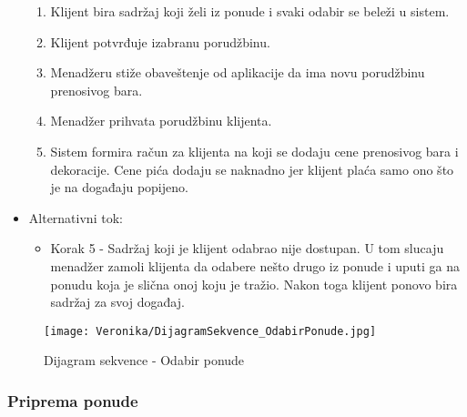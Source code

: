 \documentclass[a4paper]{article}
\begin{document}
\begin{itemize}
\begin{enumerate}
        \item Klijent bira sadržaj koji želi iz ponude i svaki odabir se beleži u sistem.
        \item Klijent potvrđuje izabranu porudžbinu.
        \item Menadžeru stiže obaveštenje od aplikacije da ima novu porudžbinu prenosivog bara.
        \item Menadžer prihvata porudžbinu klijenta.
        \item Sistem formira račun za klijenta na koji se dodaju cene prenosivog bara i dekoracije. Cene pića dodaju se naknadno jer klijent plaća samo ono što je na događaju popijeno.
        \end{enumerate}
        \item Alternativni tok:
        \begin{itemize}
            \item Korak 5 - Sadržaj koji je klijent odabrao nije dostupan. U tom slucaju menadžer zamoli klijenta da odabere nešto drugo iz ponude i uputi ga na ponudu koja je slična onoj koju je tražio. Nakon toga klijent ponovo bira sadržaj za svoj događaj.
        \end{itemize}    
    \end{itemize}


\begin{figure}[H]
    \centering
    \texttt{[image: Veronika/DijagramSekvence\_OdabirPonude.jpg]}
    \caption{Dijagram sekvence - Odabir ponude}
    \label{fig:PrenosiviBar}
\end{figure}


\subsubsection{Priprema ponude}
\end{document}
